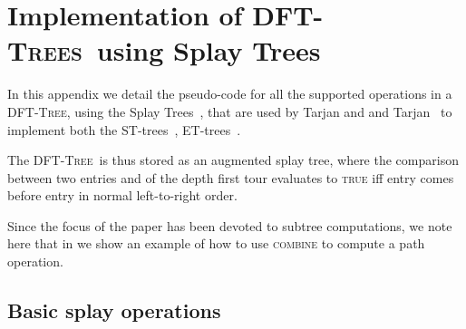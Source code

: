\documentclass[a4paper,USenglish]{lipics}
\newcommand{\dft}{\textsc{DFT-Tree}}
\newcommand{\dfts}{\textsc{DFT-Trees}}
\begin{document}
\vfill 
\pagebreak
\appendix









\section{Implementation of \dfts\ using Splay Trees}
\label{app:implementation}

In this appendix we detail the pseudo-code for all the supported operations in a \dft, using the Splay Trees~\cite{ST85}, that are used by Tarjan and  and Tarjan~\cite{TW09} to implement both the ST-trees~\cite{ST83,ST85}, ET-trees~\cite{HK99,Tar97}.

The \dft\ is thus stored as an augmented splay tree, where the comparison  between two entries  and  of the depth first tour evaluates to \textsc{true} iff entry  comes before entry  in normal left-to-right order.

Since the focus of the paper has been devoted to subtree computations, we note here that in  we show an example of how to use \textsc{combine} to compute a path operation.


\subsection{Basic splay operations}
\end{document}
